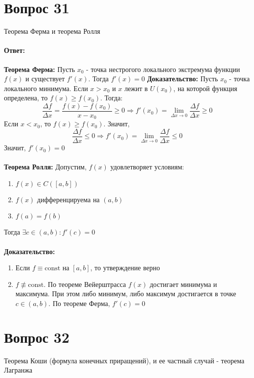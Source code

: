 \documentclass{article}
\DeclareMathOperator{\Exists}{\exists}
\begin{document}
\bigskip\bigskip
 
\part*{Вопрос 31}
\begin{center}
Теорема Ферма и теорема Ролля
\end{center}
\subsection*{Ответ:}
\textbf{Теорема Ферма:}
Пусть $x_0$ - точка нестрогого локального экстремума функции $f(x)$ и существует $f'(x)$. Тогда $f'(x)=0$
\newline
\textbf{Доказательство:}
Пусть $x_0$ - точка локального минимума. Если $x>x_0$ и $x$ лежит в $U(x_0)$, на которой функция определена, то $f(x)\geqslant f(x_0)$. Тогда:
$$
\frac{\Delta f}{\Delta x}
=
\frac{f(x) - f(x_0)}{x-x_0} \geqslant 0 \Rightarrow
f'(x_0)=\lim_{\Delta x \to 0}\frac{\Delta{f}}{\Delta{x}} \geqslant 0
$$
Если $x<x_0$, то $f(x)\geqslant f(x_0)$. Значит,
$$
\frac{\Delta{f}}{\Delta{x}}\leqslant 0 \Rightarrow
f'(x_0)=\lim_{\Delta{x}\to 0} \frac{\Delta f}{\Delta x}\leqslant0
$$
Значит, $f'(x_0) = 0$\\\\
\textbf{Теорема Ролля:} Допустим, $f(x)$ удовлетворяет условиям:
\begin{enumerate}
   \item $f(x) \in C([a,b])$
   \item $f(x)$ дифференцируема на $(a,b)$
   \item $f(a) = f(b)$
\end{enumerate}
Тогда $\Exists c\in (a,b):f'(c)=0$\\\\
\textbf{Доказательство:}
\begin{enumerate}
   \item Если $f\equiv\text{const}$ на $[a,b]$, то утверждение верно
   \item $f\not\equiv\text{const}$. По теореме Вейерштрасса $f(x)$ достигает минимума и максимума. При этом либо минимум, либо максимум достигается в точке $c\in (a,b)$. По теореме Ферма, $f'(c)=0$
\end{enumerate}
 
\part*{Вопрос 32}
\begin{center}
Теорема Коши (формула конечных приращений), и ее частный случай - теорема Лагранжа
\end{center}
\end{document}
